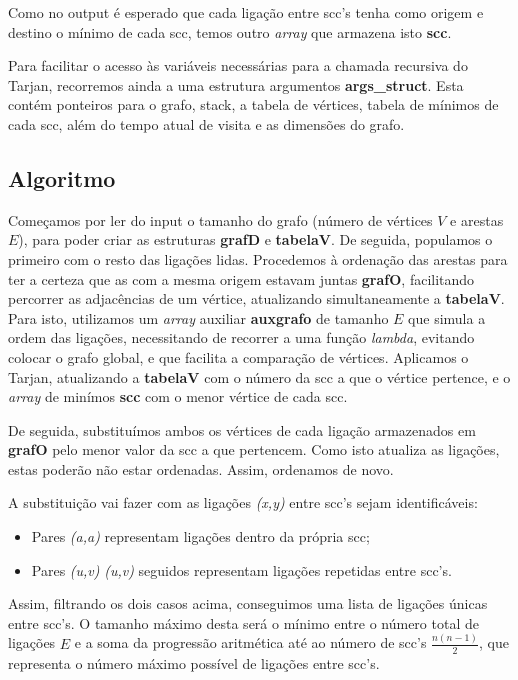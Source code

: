 \documentclass[12pt,a4paper]{article}
\begin{document}
Como no output é esperado que cada ligação entre scc's tenha como origem e destino o mínimo de cada scc, temos outro \textit{array} que armazena isto \textbf{scc}.

Para facilitar o acesso às variáveis necessárias para a chamada recursiva do Tarjan, recorremos ainda a uma estrutura argumentos \textbf{args\_struct}. Esta contém ponteiros para o grafo, stack, a tabela de vértices, tabela de mínimos de cada scc, além do tempo atual de visita e as dimensões do grafo.

\subsection{Algoritmo}
Começamos por ler do input o tamanho do grafo (número de vértices $V$ e arestas $E$), para poder criar as estruturas \textbf{grafD} e \textbf{tabelaV}. De seguida, populamos o primeiro com o resto das ligações lidas.
Procedemos à ordenação das arestas para ter a certeza que as com a mesma origem estavam juntas \textbf{grafO}, facilitando percorrer as adjacências de um vértice, atualizando simultaneamente a \textbf{tabelaV}.
Para isto, utilizamos um \textit{array} auxiliar \textbf{auxgrafo} de tamanho $E$ que simula a ordem das ligações, necessitando de recorrer a uma função \textit{lambda}, evitando colocar o grafo global, e que facilita a comparação de vértices.
Aplicamos o Tarjan, atualizando a \textbf{tabelaV} com o número da scc a que o vértice pertence, e o \textit{array} de minímos \textbf{scc} com o menor vértice de cada scc.

De seguida, substituímos ambos os vértices de cada ligação armazenados em \textbf{grafO} pelo menor valor da scc a que pertencem.
Como isto atualiza as ligações, estas poderão não estar ordenadas. Assim, ordenamos de novo.

A substituição vai fazer com as ligações \textit{(x,y)} entre scc's sejam identificáveis:
\begin{itemize}
	\item Pares \textit{(a,a)} representam ligações dentro da própria scc;
	\item Pares \textit{(u,v)} \textit{(u,v)} seguidos representam ligações repetidas entre scc's.
\end{itemize}
Assim, filtrando os dois casos acima, conseguimos uma lista de ligações únicas entre scc's.
O tamanho máximo desta será o mínimo entre o número total de ligações $E$ e a soma da progressão aritmética até ao número de scc's $\frac{n(n-1)}{2}$,
que representa o número máximo possível de ligações entre scc's.
\end{document}
